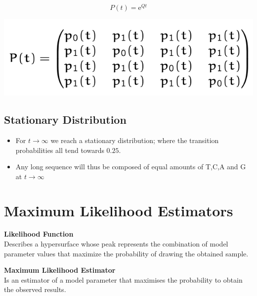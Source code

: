 \documentclass{article}
\begin{document}
\begin{multicols*}{3}
$$P(t) = \text{e}^{Qt}$$

\begin{center}
    \includegraphics[width=0.7\linewidth]{transitionprobabilitymatrix.png}
\end{center}

\subsection{Stationary Distribution}

\begin{itemize}
    \item For $t \rightarrow \infty$ we reach a stationary distribution; where the transition probabilities all tend towards $0.25$. 
    \item Any long sequence will thus be composed of equal amounts of T,C,A and G at $t \rightarrow \infty$
\end{itemize}

\section{Maximum Likelihood Estimators}
\begin{mdframed}[backgroundcolor=astral] 
    \textbf{Likelihood Function}\\
    Describes a hypersurface whose peak represents the combination of model parameter values that maximize the probability of drawing the obtained sample. 
\end{mdframed}

\begin{mdframed}[backgroundcolor=astral] 
    \textbf{Maximum Likelihood Estimator}\\
    Is an estimator of a model parameter that maximises the probability to obtain the observed results.
\end{mdframed}


\end{multicols*}
\end{document}
